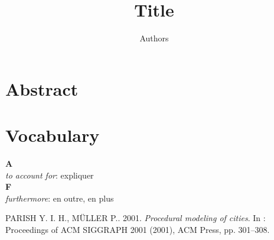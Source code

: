 \documentclass[11pt]{article}
\title{Title}
\author{Authors}
\date{
	\begin{center}
		Universities \\
		Institutions \\
		Conferences
	\end{center}
}
\begin{document}
\maketitle

\section*{Abstract}

\section{Vocabulary}

\noindent \textbf{A}\\
\textit{to account for}: expliquer \\
\textbf{F}\\
\textit{furthermore}: en outre, en plus \\

\begin{thebibliography}{2} 

\label{Parish and Muller (2001)}
PARISH Y. I. H., MÜLLER P.. 2001.
\textit{Procedural modeling of cities}.
In : Proceedings of ACM SIGGRAPH 2001 (2001), ACM Press, pp. 301–308.

\end{thebibliography}
\end{document}
